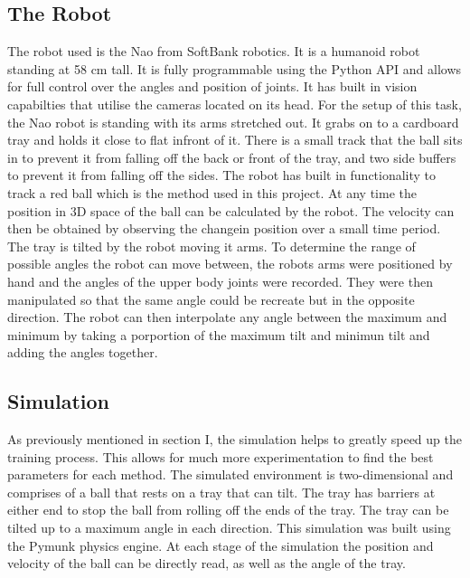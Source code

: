 \documentclass[12pt,a4paper]{article}
\begin{document}
\subsection{The Robot}
The robot used is the Nao from SoftBank robotics. It is a humanoid robot standing at 58 cm tall. It is fully programmable using the Python API and allows for full control over the angles and position of joints. It has built in vision capabilties that utilise the cameras located on its head. For the setup of this task, the Nao robot is standing with its arms stretched out. It grabs on to a cardboard tray  and holds it close to flat infront of it. There is a small track that the ball sits in to prevent it from falling off the back or front of the tray, and two side buffers to prevent it from falling off the sides. The robot has built in functionality to track a red ball which is the method used in this project. At any time the position in 3D space of the ball can be calculated by the robot. The velocity can then be obtained by observing the changein position over a small time period. The tray is tilted by the robot moving it arms. To determine the range of possible angles the robot can move between, the robots arms were positioned by hand and the angles of the upper body joints were recorded. They were then manipulated so that the same angle could be recreate but in the opposite direction. The robot can then interpolate any angle between the maximum and minimum by taking a porportion of the maximum tilt and minimun tilt and adding the angles together.

\subsection{Simulation}
As previously mentioned in section I, the simulation helps to greatly speed up the training process. This allows for much more experimentation to find the best parameters for each method. The simulated environment is two-dimensional and comprises of a ball that rests on a tray that can tilt. The tray has barriers at either end to stop the ball from rolling off the ends of the tray. The tray can be tilted up to a maximum angle in each direction. This simulation was built using the Pymunk physics engine. At each stage of the simulation the position and velocity of the ball can be directly read, as well as the angle of the tray.  
\end{document}
